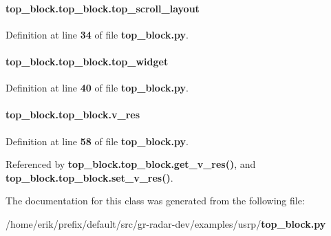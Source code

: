 \paragraph[{top\+\_\+scroll\+\_\+layout}]{\setlength{\rightskip}{0pt plus 5cm}top\+\_\+block.\+top\+\_\+block.\+top\+\_\+scroll\+\_\+layout}\label{classtop__block_1_1top__block_a7d15f4e40db5d84956ec6a19d4936444}


Definition at line {\bf 34} of file {\bf top\+\_\+block.\+py}.

\paragraph[{top\+\_\+widget}]{\setlength{\rightskip}{0pt plus 5cm}top\+\_\+block.\+top\+\_\+block.\+top\+\_\+widget}\label{classtop__block_1_1top__block_a290f6f5f7fd43a3c861b05c33955d64f}


Definition at line {\bf 40} of file {\bf top\+\_\+block.\+py}.

\paragraph[{v\+\_\+res}]{\setlength{\rightskip}{0pt plus 5cm}top\+\_\+block.\+top\+\_\+block.\+v\+\_\+res}\label{classtop__block_1_1top__block_ae7fd16c70baad3590b501cb928678095}


Definition at line {\bf 58} of file {\bf top\+\_\+block.\+py}.



Referenced by {\bf top\+\_\+block.\+top\+\_\+block.\+get\+\_\+v\+\_\+res()}, and {\bf top\+\_\+block.\+top\+\_\+block.\+set\+\_\+v\+\_\+res()}.



The documentation for this class was generated from the following file\+:\begin{DoxyCompactItemize}
\item 
/home/erik/prefix/default/src/gr-\/radar-\/dev/examples/usrp/{\bf top\+\_\+block.\+py}\end{DoxyCompactItemize}
